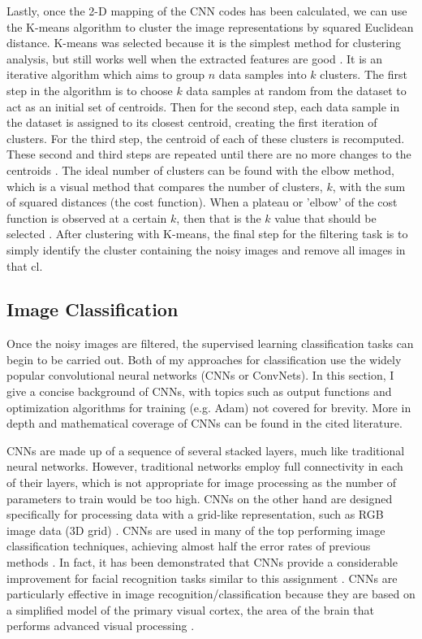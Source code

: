 \documentclass[10pt,twocolumn,letterpaper]{article}
\begin{document}
Lastly, once the 2-D mapping of the CNN codes has been calculated, we can use the K-means algorithm to cluster the image representations by squared Euclidean distance. K-means was selected because it is the simplest method for clustering analysis, but still works well when the extracted features are good \cite{JAIN2010651}. It is an iterative algorithm which aims to group $n$ data samples into $k$ clusters. The first step in the algorithm is to choose $k$ data samples at random from the dataset to act as an initial set of centroids. Then for the second step, each data sample in the dataset is assigned to its closest centroid, creating the first iteration of clusters. For the third step, the centroid of each of these clusters is recomputed. These second and third steps are repeated until there are no more changes to the centroids \cite{rodrigues2018AMLS}\cite{JAIN2010651}. The ideal number of clusters can be found with the elbow method, which is a visual method that compares the number of clusters, $k$, with the sum of squared distances (the cost function). When a plateau or 'elbow' of the cost function is observed at a certain $k$, then that is the $k$ value that should be selected \cite{rodrigues2018AMLS}\cite{kodinariya2013review}. After clustering with K-means, the final step for the filtering task is to simply identify the cluster containing the noisy images and remove all images in that cl.

\subsection{Image Classification} \label{classification}

Once the noisy images are filtered, the supervised learning classification tasks can begin to be carried out. Both of my approaches for classification use the widely popular convolutional neural networks (CNNs or ConvNets). In this section, I give a concise background of CNNs, with topics such as output functions and optimization algorithms for training (e.g. Adam) not covered for brevity. More in depth and mathematical coverage of CNNs can be found in the cited literature.

CNNs are made up of a sequence of several stacked layers, much like traditional neural networks. However, traditional networks employ full connectivity in each of their layers, which is not appropriate for image processing as the number of parameters to train would be too high. CNNs on the other hand are designed specifically for processing data with a grid-like representation, such as RGB image data (3D grid) \cite[p.321]{goodfellow2016deep}.
CNNs are used in many of the top performing image classification techniques, achieving almost half the error rates of previous methods \cite{lecun2015deep}\cite{krizhevsky2012imagenet}. In fact, it has been demonstrated that CNNs provide a considerable improvement for facial recognition tasks similar to this assignment \cite{taigman2014deepface}. CNNs are particularly effective in image recognition/classification because they are based on a simplified model of the primary visual cortex, the area of the brain that performs advanced visual processing \cite[p.353]{goodfellow2016deep}.
\end{document}
